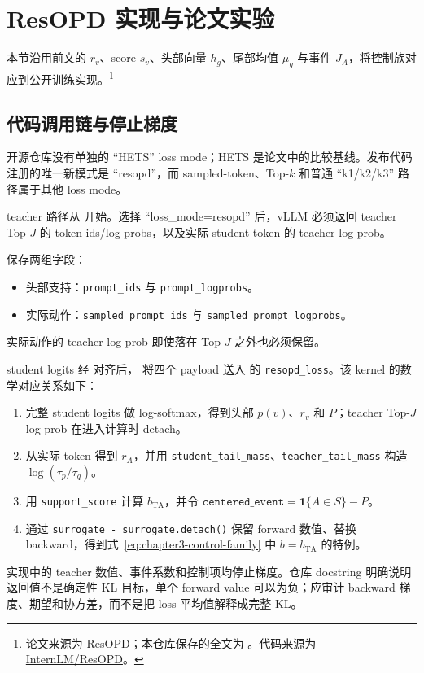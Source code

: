 \section{ResOPD 实现与论文实验}
\label{sec:resopd-implementation}

本节沿用前文的 $r_v$、score $s_v$、头部向量 $h_g$、尾部均值 $\mu_g$ 与事件 $J_A$，将控制族对应到公开训练实现。\footnote{论文来源为 \href{https://arxiv.org/abs/2610.04882}{ResOPD}；本仓库保存的全文为 。代码来源为 \href{https://github.com/InternLM/ResOPD}{InternLM/ResOPD}。}

\subsection{代码调用链与停止梯度}

开源仓库没有单独的 ``HETS'' loss mode；HETS 是论文中的比较基线。发布代码注册的唯一新模式是 ``resopd''，而 sampled-token、Top-$k$ 和普通 ``k1/k2/k3'' 路径属于其他 loss mode。

teacher 路径从  开始。选择 ``loss\_mode=resopd'' 后，vLLM 必须返回 teacher Top-$J$ 的 token ids/log-probs，以及实际 student token 的 teacher log-prob。

 保存两组字段：
\begin{itemize}
\item 头部支持：\texttt{prompt\_ids} 与 \texttt{prompt\_logprobs}。
\item 实际动作：\texttt{sampled\_prompt\_ids} 与 \texttt{sampled\_prompt\_logprobs}。
\end{itemize}
实际动作的 teacher log-prob 即使落在 Top-$J$ 之外也必须保留。

student logits 经  对齐后， 将四个 payload 送入  的 \texttt{resopd\_loss}。该 kernel 的数学对应关系如下：
\begin{enumerate}
\item 完整 student logits 做 log-softmax，得到头部 $p(v)$、$r_v$ 和 $P$；teacher Top-$J$ log-prob 在进入计算时 detach。
\item 从实际 token 得到 $r_A$，并用 \texttt{student\_tail\_mass}、\texttt{teacher\_tail\_mass} 构造 $\log(\tau_p/\tau_q)$。
\item 用 \texttt{support\_score} 计算 $b_{\mathrm{TA}}$，并令 $\texttt{centered\_event}=\mathbf 1\{A\in S\}-P$。
\item 通过 \texttt{surrogate - surrogate.detach()} 保留 forward 数值、替换 backward，得到式~\eqref{eq:chapter3-control-family} 中 $b=b_{\mathrm{TA}}$ 的特例。
\end{enumerate}
实现中的 teacher 数值、事件系数和控制项均停止梯度。仓库 docstring 明确说明返回值不是确定性 KL 目标，单个 forward value 可以为负；应审计 backward 梯度、期望和协方差，而不是把 loss 平均值解释成完整 KL。

